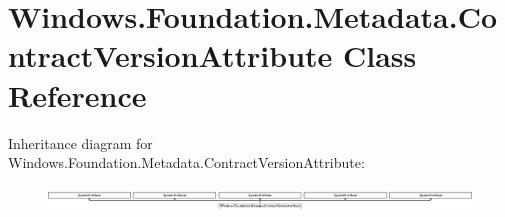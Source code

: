 \hypertarget{class_windows_1_1_foundation_1_1_metadata_1_1_contract_version_attribute}{}\section{Windows.\+Foundation.\+Metadata.\+Contract\+Version\+Attribute Class Reference}
\label{class_windows_1_1_foundation_1_1_metadata_1_1_contract_version_attribute}
Inheritance diagram for Windows.\+Foundation.\+Metadata.\+Contract\+Version\+Attribute\+:\begin{figure}[H]
\begin{center}
\leavevmode
\includegraphics[height=0.666667cm]{class_windows_1_1_foundation_1_1_metadata_1_1_contract_version_attribute}
\end{center}
\end{figure}
